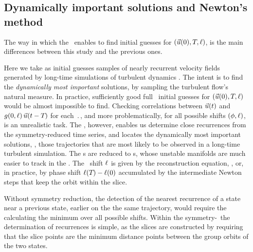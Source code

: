 \subsection{Dynamically important solutions and Newton's method}
\label{s:reqva}

The way in which the \mslices\ enables to find initial
guesses for $(\vec{u}(0),{T_{}},\ell)$, is the main differences
between this study and the previous ones.

Here we take as initial guesses samples of nearly recurrent velocity
fields generated by long-time simulations of turbulent dynamics
. The intent is to find the {\em dynamically most
important} solutions, by sampling the turbulent flow's natural measure.
In practice, sufficiently good full \statesp\ initial guesses for
$(\vec{u}(0),{T_{}},\ell)$ would be almost impossible to find.
Checking correlations between $\vec{u}(t)$ and
$g(0,\ell)\,\vec{u}(t-{T_{}})$ for each $\period{}$, and
more problematically, for all possible shifts $(\phi,\ell)$, is an
unrealistic task. The \mslices, however, enables us determine close
recurrences  from the symmetry-reduced time series, and locates the
dynamically most important solutions, \ie, those trajectories that are
most likely to be observed in a long-time turbulent simulation. The \rpo
s are reduced to \po s, whose unstable manifolds are much easier to track
in the \reducedsp. The \rpo\ shift $\ell$ is given by the
reconstruction equation, , or, in practice, by phase
shift $\ell({T_{}})-\ell(0)$ accumulated by the intermediate
Newton steps that keep the orbit within the slice.

Without symmetry reduction, the detection of the nearest recurrence of a
state near a previous state, earlier on the the same trajectory, would
require the calculating the minimum over all possible shifts. Within the
symmetry-\reducedsp\ the determination of recurrences is simple, as the
slices are constructed by requiring that the slice points are the minimum
distance points between the group orbits of the two states.
